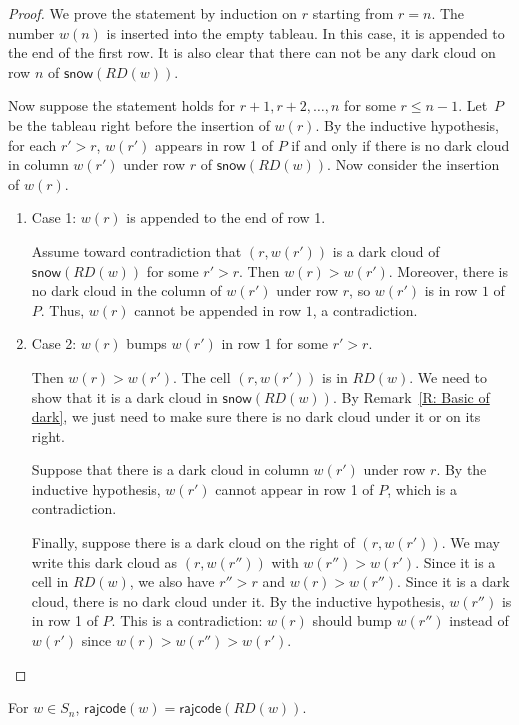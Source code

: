\documentclass[ALCO]{cedram}
\newcommand{\snow}{\mathsf{snow}}
\newcommand{\rajcode}{\mathsf{rajcode}}
\begin{document}
\begin{proof}
We prove the statement by induction on $r$ starting from $r=n$.
The number $w(n)$ is inserted into the empty tableau. 
In this case, it is appended to the end of the first row. 
It is also clear that there can not be any dark cloud on row $n$ of $\snow(RD(w))$.

Now suppose the statement holds for $r+1,r+2,\dots,n$ for some $r \leqslant n-1$. 
Let~$P$ be the tableau right before the insertion of $w(r)$.
By the inductive hypothesis, for each $r' > r$, $w(r')$ appears in row 1 of $P$
if and only if there is no dark cloud in column $w(r')$ under row $r$ of $\snow(RD(w))$.
Now consider the insertion of $w(r)$.
\begin{enumerate}
\item Case 1: $w(r)$ is appended to the end of row 1. 

Assume toward contradiction that $(r, w(r'))$ is a dark cloud of $\snow(RD(w))$ for some $r' > r$. 
Then $w(r) > w(r')$. 
Moreover, there is no dark cloud in the column of $w(r')$ under row $r$,
so $w(r')$ is in row $1$ of $P$. 
Thus, $w(r)$ cannot be appended in row $1$, a contradiction.
\item Case 2: $w(r)$ bumps $w(r')$ in row 1 for some $r' > r$.

Then $w(r) > w(r')$.
The cell $(r, w(r'))$ is in $RD(w)$. We need to show that it is a dark cloud in $\snow(RD(w))$.
By Remark~\ref{R: Basic of dark}, we just need to make sure
there is no dark cloud under it or on its right.

Suppose that there is a dark cloud in column $w(r')$ under row $r$. By the inductive hypothesis, $w(r')$ cannot appear in row 1 of $P$, which is a contradiction.

Finally, suppose there is a dark cloud on the right of $(r, w(r'))$.
We may write this dark cloud as $(r, w(r''))$ with $w(r'') > w(r')$.
Since it is a cell in $RD(w)$,
we also have $r'' > r$ and $w(r) > w(r'')$.
Since it is a dark cloud, there is no dark cloud under it.
By the inductive hypothesis, $w(r'')$ is in row 1 of $P$.
This is a contradiction: $w(r)$ should bump $w(r'')$ instead of $w(r')$ 
since $w(r) > w(r'') > w(r')$. \qedhere
\end{enumerate}
\end{proof}


\begin{ourthm}
\label{T: equivalence of rajcode on perm}
For $w \in S_n$, 
$\rajcode(w) = \rajcode(RD(w))$.
\end{ourthm}
\end{document}

